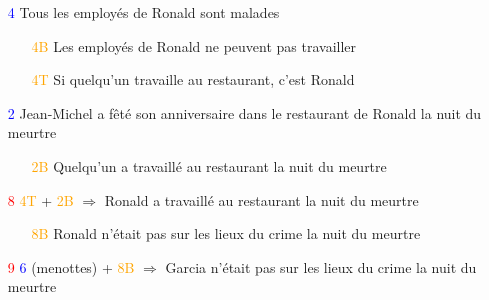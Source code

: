 \begin{frame}

\begin{itemize}

     \item[\textcolor{blue}4] Tous les employés de Ronald sont malades \pause
\begin{itemize}
     \item[\textcolor{orange}{4B}] Les employés de Ronald ne peuvent pas travailler\pause
     
     \item[\textcolor{orange}{4T}] Si quelqu'un travaille au restaurant, c'est Ronald\pause
     
\end{itemize}
     \item[\textcolor{blue}2] Jean-Michel a fêté son anniversaire dans le restaurant de Ronald la nuit du meurtre\pause 
     \begin{itemize}
     \item[\textcolor{orange}{2B}] Quelqu'un a travaillé au restaurant la nuit du meurtre\pause
     \end{itemize}
     \item[\textcolor{red}8] \textcolor{orange}{4T} + \textcolor{orange}{2B} $\Rightarrow$ Ronald a travaillé au restaurant la nuit du meurtre\pause 
\begin{itemize}
     \item[\textcolor{orange}{8B}] Ronald n'était pas sur les lieux du crime la nuit du meurtre
     \end{itemize}
     \pause
     
     \item[\textcolor{red}{9}] \textcolor{blue}{6} (menottes) + \textcolor{orange}{8B} $\Rightarrow$ Garcia n'était pas sur les lieux du crime la nuit du meurtre

\end{itemize}
\end{frame}



